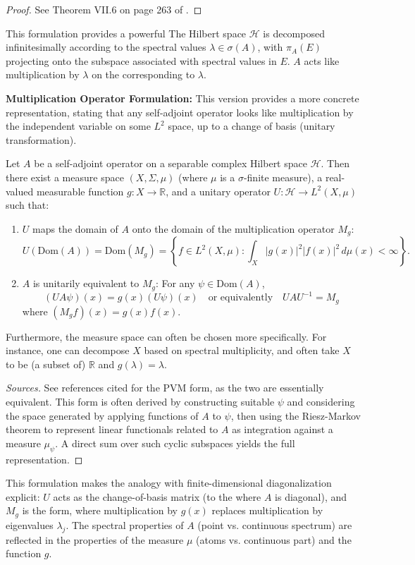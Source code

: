 \begin{proof}
    See Theorem VII.6 on page 263 of \cite{ReedSimon1980}.
\end{proof}

This formulation provides a powerful  The Hilbert space $\mathcal{H}$ is decomposed infinitesimally according to the spectral values $\lambda \in \sigma(A)$, with $\pi_A(E)$ projecting onto the subspace associated with spectral values in $E$. $A$ acts like multiplication by $\lambda$ on the  corresponding to $\lambda$.

\textbf{Multiplication Operator Formulation:}
This version provides a more concrete representation, stating that any self-adjoint operator looks like multiplication by the independent variable on some $L^2$ space, up to a change of basis (unitary transformation).

\begin{theorem}
\label{thm:spectral_mult}
Let $A$ be a self-adjoint operator on a separable complex Hilbert space $\mathcal{H}$. Then there exist a measure space $(X, \Sigma, \mu)$ (where $\mu$ is a $\sigma$-finite measure), a real-valued measurable function $g: X \to \mathbb{R}$, and a unitary operator $U: \mathcal{H} \to L^2(X, \mu)$ such that:
\begin{enumerate}
    \item $U$ maps the domain of $A$ onto the domain of the multiplication operator $M_g$:
        \[ U(\text{Dom}(A)) = \text{Dom}(M_g) = \left\{ f \in L^2(X, \mu) : \int_X |g(x)|^2 |f(x)|^2 \, d\mu(x) < \infty \right\}. \]
    \item $A$ is unitarily equivalent to $M_g$: For any $\psi \in \text{Dom}(A)$,
        \[ (U A \psi)(x) = g(x) (U\psi)(x) \quad \text{or equivalently} \quad U A U^{-1} = M_g \]
        where $(M_g f)(x) = g(x)f(x)$.
\end{enumerate}
Furthermore, the measure space can often be chosen more specifically. For instance, one can decompose $X$ based on spectral multiplicity, and often take $X$ to be (a subset of) $\mathbb{R}$ and $g(\lambda) = \lambda$.
\end{theorem}
\begin{proof}[Sources]
See references cited for the PVM form, as the two are essentially equivalent. This form is often derived by constructing suitable  $\psi$ and considering the space generated by applying functions of $A$ to $\psi$, then using the Riesz-Markov theorem to represent linear functionals related to $A$ as integration against a measure $\mu_\psi$. A direct sum over such cyclic subspaces yields the full representation.
\end{proof}
This formulation makes the analogy with finite-dimensional diagonalization explicit: $U$ acts as the change-of-basis matrix (to the  where $A$ is diagonal), and $M_g$ is the  form, where multiplication by $g(x)$ replaces multiplication by eigenvalues $\lambda_j$. The spectral properties of $A$ (point vs. continuous spectrum) are reflected in the properties of the measure $\mu$ (atoms vs. continuous part) and the function $g$.

